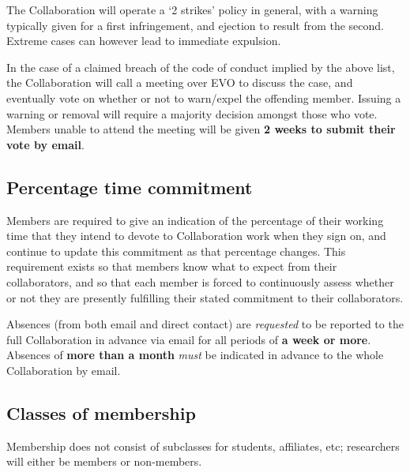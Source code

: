 The Collaboration will operate a `2 strikes' policy in general, with a warning typically given for a first infringement, and ejection to result from the second.  Extreme cases can however lead to immediate expulsion.

In the case of a claimed breach of the code of conduct implied by the above list, the Collaboration will call a meeting over EVO to discuss the case, and eventually vote on whether or not to warn/expel the offending member.  Issuing a warning or removal will require a majority decision amongst those who vote.  Members unable to attend the meeting will be given \textbf{2 weeks to submit their vote by email}.

\subsection{Percentage time commitment}

Members are required to give an indication of the percentage of their working time that they intend to devote to Collaboration work when they sign on, and continue to update this commitment as that percentage changes.  This requirement exists so that members know what to expect from their collaborators, and so that each member is forced to continuously assess whether or not they are presently fulfilling their stated commitment to their collaborators.

Absences (from both email and direct contact) are \textit{requested} to be reported to the full Collaboration in advance via email for all periods of \textbf{a week or more}.  Absences of \textbf{more than a month} \textit{must} be indicated in advance to the whole Collaboration by email.

\subsection{Classes of membership}

Membership does not consist of subclasses for students, affiliates, etc; researchers will either be members or non-members.

